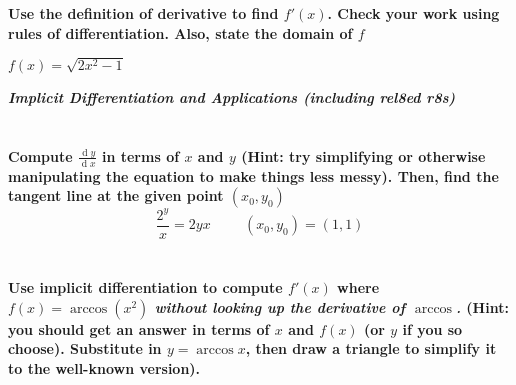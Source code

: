 \documentclass[english]{article}
\renewcommand{\d}[1]{\ensuremath{\operatorname{d}\!{#1}}}
\newcommand{\dydx}[2]{\frac{\d #1}{\d #2}}
\newcommand{\prob}[1]{\setcounter{section}{#1-1}\section{}}
\theoremstyle{remark}
\theoremstyle{definition}
\newcommand{\ild}[1]{\displaystyle{#1}}
\begin{document}
\prob{0}\textbf{Use the definition of derivative to find $f'(x)$. Check your work using rules of differentiation. Also, state the domain of $f$}

$\ild{f(x)=\sqrt{2x^2-1}}$
     
	\newpage
	\begin{center}{\Large\textbf{\emph{Implicit Differentiation and Applications (including rel8ed r8s)}}}\end{center}
	\prob{1} \textbf{Compute $\dydx{y}{x}$ in terms of $x$ and $y$ (Hint: try simplifying or otherwise manipulating the equation to make things less messy). Then, find the tangent line at the given point $(x_0,y_0)$}\newline
	$$\ild{\frac{2^{y}}{x}=2yx}\hspace{1cm}(x_0,y_0)=(1,1)$$\vspace{3in}

\prob{2} \textbf{Use implicit differentiation to compute $f'(x)$ where $f(x)=\arccos({x^2})$ \emph{without looking up the derivative of $\arccos$.} (Hint: you should get an answer in terms of $x$ and $f(x)$ (or $y$ if you so choose). Substitute in $y=\arccos x$, then draw a triangle to simplify it to the well-known version).}\newpage
%	
%	
\end{document}

